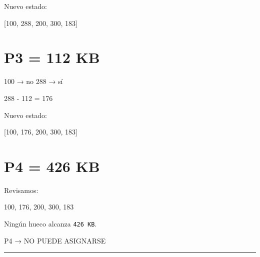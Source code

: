 \documentclass[
  spanish,
  letterpaper,
]{scrbook}
\newenvironment{Shaded}{\begin{snugshade}}{\end{snugshade}}
\newcommand{\NormalTok}[1]{\textcolor[rgb]{0.00,0.23,0.31}{#1}}
\begin{document}
Nuevo estado:

\begin{Shaded}
\begin{Highlighting}[]
\NormalTok{[100, 288, 200, 300, 183]}
\end{Highlighting}
\end{Shaded}

\section{P3 = 112 KB}\label{p3-112-kb}

\begin{Shaded}
\begin{Highlighting}[]
\NormalTok{100 → no}
\NormalTok{288 → sí}
\end{Highlighting}
\end{Shaded}

\begin{Shaded}
\begin{Highlighting}[]
\NormalTok{288 {-} 112 = 176}
\end{Highlighting}
\end{Shaded}

Nuevo estado:

\begin{Shaded}
\begin{Highlighting}[]
\NormalTok{[100, 176, 200, 300, 183]}
\end{Highlighting}
\end{Shaded}

\section{P4 = 426 KB}\label{p4-426-kb}

Revisamos:

\begin{Shaded}
\begin{Highlighting}[]
\NormalTok{100, 176, 200, 300, 183}
\end{Highlighting}
\end{Shaded}

Ningún hueco alcanza \texttt{426\ KB}.

\begin{Shaded}
\begin{Highlighting}[]
\NormalTok{P4 → NO PUEDE ASIGNARSE}
\end{Highlighting}
\end{Shaded}

\begin{center}\rule{0.5\linewidth}{0.5pt}\end{center}
\end{document}

